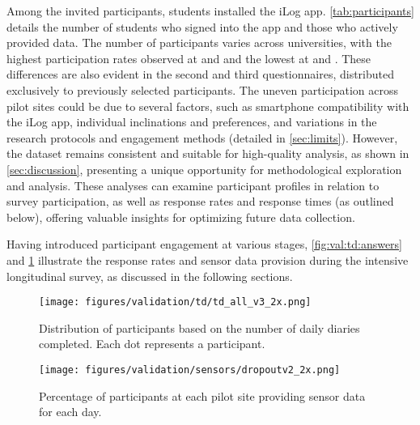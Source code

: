 Among the invited participants, \nilogusers students installed the iLog app. \cref{tab:participants} details the number of students who signed into the app and those who actively provided data. The number of participants varies across universities, with the highest participation rates observed at \NUM and \UNITN and the lowest at \AAU and \IPICYT. These differences are also evident in the second and third questionnaires, distributed exclusively to previously selected participants. The uneven participation across pilot sites could be due to several factors, such as smartphone compatibility with the iLog app, individual inclinations and preferences, and variations in the research protocols and engagement methods (detailed in \cref{sec:limits}). However, the dataset remains consistent and suitable for high-quality analysis, as shown in \cref{sec:discussion}, presenting a unique opportunity for methodological exploration and analysis. These analyses can examine participant profiles in relation to survey participation, as well as response rates and response times (as outlined below), offering valuable insights for optimizing future data collection.

Having introduced participant engagement at various stages, \cref{fig:val:td:answers} and \cref{fig:val:dropout} illustrate the response rates and sensor data provision during the intensive longitudinal survey, as discussed in the following sections.

\begin{figure}[t]
\begin{minipage}[c]{0.47\linewidth}
\texttt{[image: figures/validation/td/td\_all\_v3\_2x.png]}
 \caption{Distribution of participants based on the number of daily diaries completed. Each dot represents a participant.}
 \label{fig:val:td:answers}
\end{minipage}
\hfill
\begin{minipage}[c]{0.47\linewidth}
\texttt{[image: figures/validation/sensors/dropoutv2\_2x.png]}
\caption{Percentage of participants at each pilot site providing sensor data for each day.}
\label{fig:val:dropout}
\end{minipage}%
\end{figure}


